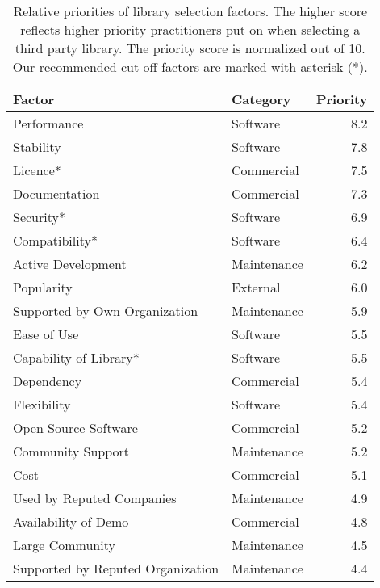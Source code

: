 \begin{table}[htbp]
  \centering
  \caption{Relative priorities of library selection factors. The higher score reflects higher priority practitioners put on when selecting a third party library. The priority score is normalized out of 10. Our recommended cut-off factors are marked with asterisk (*).}
    \begin{tabular}{llr}
    \toprule
    \textbf{Factor} & \textbf{Category} & \multicolumn{1}{l}{\textbf{Priority}} \\
    \midrule
    Performance & Software &                 8.2  \\
    Stability & Software &                 7.8  \\
    Licence* & Commercial &                 7.5  \\
    Documentation & Commercial &                 7.3  \\
    Security* & Software &                 6.9  \\
    Compatibility* & Software &                 6.4  \\
    Active Development & Maintenance &                 6.2  \\
    Popularity & External &                 6.0  \\
    Supported by Own Organization & Maintenance &                 5.9  \\
    Ease of Use & Software &                 5.5  \\
    Capability of Library* & Software &                 5.5  \\
    Dependency & Commercial &                 5.4  \\
    Flexibility & Software &                 5.4  \\
    Open Source Software & Commercial &                 5.2  \\
    Community Support & Maintenance &                 5.2  \\
    Cost  & Commercial &                 5.1  \\
    Used by Reputed Companies & Maintenance &                 4.9  \\
    Availability of Demo & Commercial &                 4.8  \\
    Large Community & Maintenance &                 4.5  \\
    Supported by Reputed Organization & Maintenance &                 4.4  \\

\end{tabular}
\end{table}
